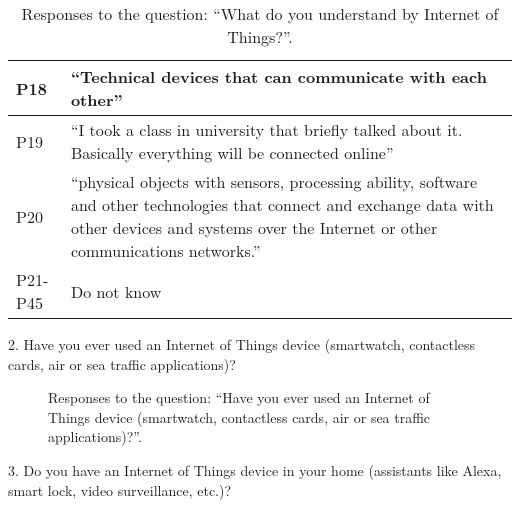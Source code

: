 \begin{table}[H]
\begin{tabular}{p{3cm} p{12cm}}
        \hline
        P18 & ``Technical devices that can communicate with each other'' \\
        \hline
        P19 & ``I took a class in university that briefly talked about it. Basically everything will be connected online'' \\
        \hline
        P20 & ``physical objects with sensors, processing ability, software and other technologies that connect and exchange data with other devices and systems over the Internet or other communications networks.'' \\
        \hline
        P21-P45 & Do not know \\
        \hline
    \end{tabular}
    \vspace{1em}
    \caption{Responses to the question: ``What do you understand by Internet of Things?''.}
    \label{table:survey_s6_q1}
\end{table}

2. Have you ever used an Internet of Things device (smartwatch, contactless cards, air or sea traffic applications)?

\begin{figure}[H]
    \begin{center}
        \caption{Responses to the question: ``Have you ever used an Internet of Things device (smartwatch, contactless cards, air or sea traffic applications)?''.}
        \label{fig:survey_s6_q2}
    \end{center}
\end{figure}

3. Do you have an Internet of Things device in your home (assistants like Alexa, smart lock, video surveillance, etc.)?

